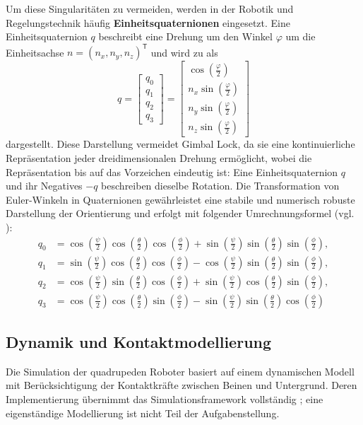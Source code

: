 Um diese Singularitäten zu vermeiden, werden in der Robotik und Regelungstechnik häufig \textbf{Einheitsquaternionen} eingesetzt. Eine Einheitsquaternion $q$ beschreibt eine Drehung um den Winkel $\varphi$ um die Einheitsachse $n=(n_x,n_y,n_z)^{\mathsf{T}}$ und wird zu \cite{Siciliano2016Handbook} als
\begin{equation}
	q = \begin{bmatrix}
		q_0 \\
		q_1 \\
		q_2 \\
		q_3
	\end{bmatrix} = \begin{bmatrix}
		\cos(\frac{\varphi}{2}) \\
		n_x\sin(\frac{\varphi}{2}) \\
		n_y\sin(\frac{\varphi}{2}) \\
		n_z\sin(\frac{\varphi}{2})
	\end{bmatrix}
\end{equation}
dargestellt. Diese Darstellung vermeidet Gimbal Lock, da sie eine kontinuierliche Repräsentation jeder dreidimensionalen Drehung ermöglicht, wobei die Repräsentation bis auf das Vorzeichen eindeutig ist: Eine Einheitsquaternion $q$ und ihr Negatives $-q$ beschreiben dieselbe Rotation. Die Transformation von Euler-Winkeln in Quaternionen gewährleistet eine stabile und numerisch robuste Darstellung der Orientierung und erfolgt mit folgender Umrechnungsformel (vgl. \cite{Diebel2006}):
\begin{equation}
\begin{aligned}
	q_0 &= \cos(\frac{\psi}{2})\cos(\frac{\theta}{2})\cos(\frac{\phi}{2}) + \sin(\frac{\psi}{2})\sin(\frac{\theta}{2})\sin(\frac{\phi}{2}), \\
	q_1 &= \sin(\frac{\psi}{2})\cos(\frac{\theta}{2})\cos(\frac{\phi}{2}) - \cos(\frac{\psi}{2})\sin(\frac{\theta}{2})\sin(\frac{\phi}{2}), \\
	q_2 &= \cos(\frac{\psi}{2})\sin(\frac{\theta}{2})\cos(\frac{\phi}{2}) + \sin(\frac{\psi}{2})\cos(\frac{\theta}{2})\sin(\frac{\phi}{2}), \\
	q_3 &= \cos(\frac{\psi}{2})\cos(\frac{\theta}{2})\sin(\frac{\phi}{2}) - \sin(\frac{\psi}{2})\sin(\frac{\theta}{2})\cos(\frac{\phi}{2})
\end{aligned}
\end{equation}

\subsection{Dynamik und Kontaktmodellierung}
Die Simulation der quadrupeden Roboter basiert auf einem dynamischen Modell mit Berücksichtigung der Kontaktkräfte zwischen Beinen und Untergrund. Deren Implementierung übernimmt das Simulationsframework vollständig \cite{authorsGenesisGenerativeUniversal2024}; eine eigenständige Modellierung ist nicht Teil der Aufgabenstellung.